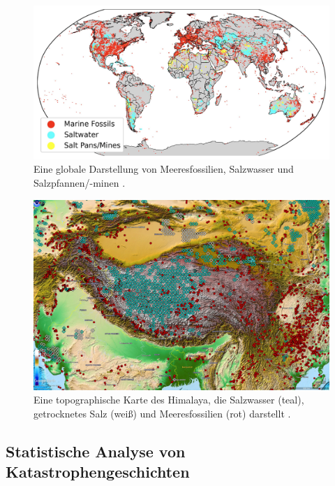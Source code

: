 \documentclass[10pt,twocolumn,letterpaper]{article}
\begin{document}
\begin{figure}[t]
\begin{center}
\includegraphics[width=1\textwidth]{marine.jpg}
\end{center}
   \caption{Eine globale Darstellung von Meeresfossilien, Salzwasser und Salzpfannen/-minen \cite{15,16,86,87}.}
   \label{fig:2}
\end{figure}

\begin{figure}[t]
\begin{center}
   \includegraphics[width=1\linewidth]{tibet.jpg}
\end{center}
   \caption{Eine topographische Karte des Himalaya, die Salzwasser (teal), getrocknetes Salz (weiß) und Meeresfossilien (rot) darstellt \cite{15,16,86,87}.}
\label{fig:3}
\label{fig:onecol}
\end{figure}

\subsection{Statistische Analyse von Katastrophengeschichten}
\end{document}
